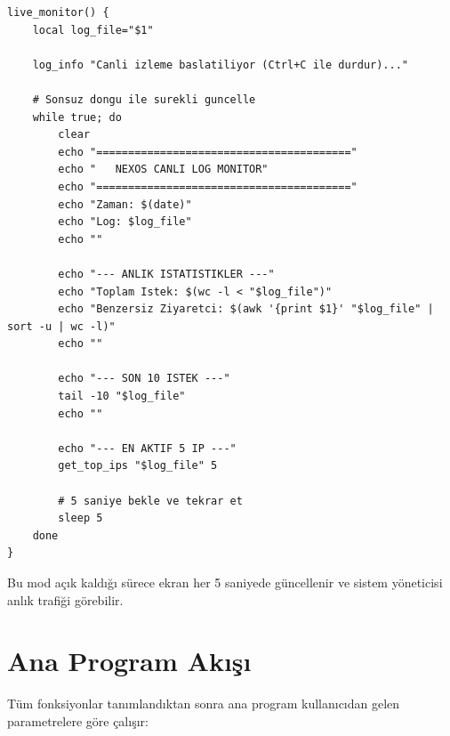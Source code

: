 \documentclass[12pt,a4paper]{report}
\begin{document}
\begin{lstlisting}[style=bashstyle,caption={Canli Izleme Fonksiyonu}]
live_monitor() {
    local log_file="$1"
    
    log_info "Canli izleme baslatiliyor (Ctrl+C ile durdur)..."
    
    # Sonsuz dongu ile surekli guncelle
    while true; do
        clear
        echo "========================================"
        echo "   NEXOS CANLI LOG MONITOR"
        echo "========================================"
        echo "Zaman: $(date)"
        echo "Log: $log_file"
        echo ""
        
        echo "--- ANLIK ISTATISTIKLER ---"
        echo "Toplam Istek: $(wc -l < "$log_file")"
        echo "Benzersiz Ziyaretci: $(awk '{print $1}' "$log_file" | sort -u | wc -l)"
        echo ""
        
        echo "--- SON 10 ISTEK ---"
        tail -10 "$log_file"
        echo ""
        
        echo "--- EN AKTIF 5 IP ---"
        get_top_ips "$log_file" 5
        
        # 5 saniye bekle ve tekrar et
        sleep 5
    done
}
\end{lstlisting}

Bu mod açık kaldığı sürece ekran her 5 saniyede güncellenir ve sistem yöneticisi anlık trafiği görebilir.

\section{Ana Program Akışı}

Tüm fonksiyonlar tanımlandıktan sonra ana program kullanıcıdan gelen parametrelere göre çalışır:
\end{document}
